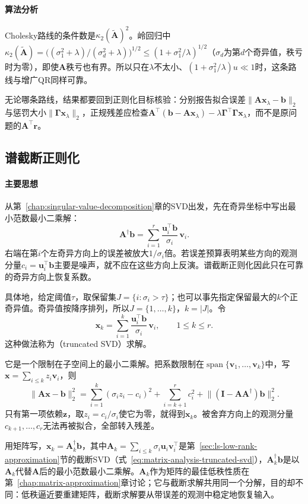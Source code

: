 \paragraph{算法分析}
Cholesky路线的条件数是$\kappa_2(\tilde{\bm A})^2$。岭回归中$\kappa_2(\tilde{\bm A})=\bigl((\sigma_1^2+\lambda)/(\sigma_d^2+\lambda)\bigr)^{1/2}\leq(1+\sigma_1^2/\lambda)^{1/2}$（$\sigma_d$为第$d$个奇异值，秩亏时为零），即使$\bm A$秩亏也有界。所以只在$\lambda$不太小、$(1+\sigma_1^2/\lambda)u\ll1$时，这条路线与增广QR同样可靠。

无论哪条路线，结果都要回到正则化目标核验：分别报告拟合误差$\lVert\bm A\bm x_\lambda-\bm b\rVert_2$与惩罚大小$\lVert\bm\Gamma\bm x_\lambda\rVert_2$，正规残差应检查$\bm A^\top(\bm b-\bm A\bm x_\lambda)-\lambda\bm\Gamma^\top\bm\Gamma\bm x_\lambda$，而不是原问题的$\bm A^\top\bm r$。

\subsection{谱截断正则化}
\label{sec:ls-tsvd-solve}

\paragraph{主要思想}
从第~\ref{chap:singular-value-decomposition}章的SVD出发，先在奇异坐标中写出最小范数最小二乘解：
\[
 \bm A^\dagger\bm b=\sum_{i=1}^r\frac{\bm u_i^\top\bm b}{\sigma_i}\,\bm v_i .
\]
右端在第$i$个左奇异方向上的误差被放大$1/\sigma_i$倍。若误差预算表明某些方向的观测分量$c_i=\bm u_i^\top\bm b$主要是噪声，就不应在这些方向上反演。谱截断正则化因此只在可靠的奇异方向上恢复系数。

具体地，给定阈值$\tau$，取保留集$J=\{i:\sigma_i>\tau\}$；也可以事先指定保留最大的$k$个正奇异值。奇异值按降序排列，所以$J=\{1,\ldots,k\}$，$k=|J|$。令
\[
 \bm x_k=\sum_{i=1}^k\frac{\bm u_i^\top\bm b}{\sigma_i}\,\bm v_i ,\qquad 1\leq k\leq r .
\]
这种做法称为（truncated SVD）求解。

它是一个限制在子空间上的最小二乘解。把系数限制在$\operatorname{span}\{\bm v_1,\ldots,\bm v_k\}$中，写$\bm x=\sum_{i\leq k}z_i\bm v_i$，则
\[
\lVert\bm A\bm x-\bm b\rVert_2^2=\sum_{i=1}^k(\sigma_iz_i-c_i)^2+\sum_{i=k+1}^rc_i^2+\lVert(\bm I-\bm A\bm A^\dagger)\bm b\rVert_2^2 .
\]
只有第一项依赖$\bm z$，取$z_i=c_i/\sigma_i$使它为零，就得到$\bm x_k$。被舍弃方向上的观测分量$c_{k+1},\ldots,c_r$无法再被拟合，全部转入残差。

用矩阵写，$\bm x_k=\bm A_k^\dagger\bm b$，其中$\bm A_k=\sum_{i\leq k}\sigma_i\bm u_i\bm v_i^\top$是第~\ref{sec:ls-low-rank-approximation}节的截断SVD（式~\eqref{eq:matrix-analysis-truncated-svd}），$\bm A_k^\dagger\bm b$是以$\bm A_k$代替$\bm A$后的最小范数最小二乘解。$\bm A_k$作为矩阵的最佳低秩性质在第~\ref{chap:matrix-approximation}章讨论；它与截断求解共用同一个分解，目的却不同：低秩逼近要重建矩阵，截断求解要从带误差的观测中稳定地恢复输入。

